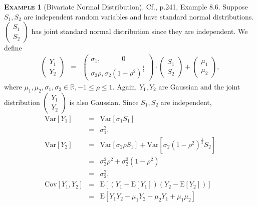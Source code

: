 \documentclass[a4paper, twoside, 11pt]{article}
\theoremstyle{definition}
\newtheorem{example}[definition]{\scshape Example}
\begin{document}
  \begin{example}[Bivariate Normal Distribution]
	Cf.\cite{severini}, p.241, Example 8.6. Suppose $S_1, S_2$ are independent random variables and have standard normal distributions. $\left(
	  \begin{array}{c}
		S_1 \\
		S_2
	  \end{array}
	\right)$  has joint standard normal distribution since they are independent. We define
	\begin{eqnarray}
	  \left(
	  \begin{array}{c}
		Y_1 \\
		Y_2
	  \end{array}
	  \right)
	  &=& 
	  \left(
	  \begin{array}{l}
		\sigma_1,\hspace{3em} 0 \\
		\sigma_2 \rho, \sigma_2(1-\rho^2)^{\frac{1}{2}}
	  \end{array}
	\right) \cdot
	  \left(
	  \begin{array}{c}
		S_1 \\
		S_2
	  \end{array}
	\right)  +
	\left(
	  \begin{array}{c}
		\mu_1 \\
		\mu_2
	  \end{array}
	\right)
	\label{sec:bi},
	\end{eqnarray}
	where $\mu_1, \mu_2, \sigma_1, \sigma_2 \in \mathbb{R}, -1 \le \rho \le 1$. Again, $Y_1, Y_2$ are Gaussian and the joint distribution  $\left(
	  \begin{array}{c}
		Y_1 \\
		Y_2
	  \end{array}
	  \right)$ is also Gaussian.  Since $S_1, S_2$ are independent,
	  \begin{eqnarray*}
		\mathrm{Var}[Y_1] &=& \mathrm{Var}[\sigma_1 S_1]\\
						   &=& \sigma_1^2 ,\\
						   \mathrm{Var}[Y_2] &=& \mathrm{Var}[\sigma_2\rho S_1] + \mathrm{Var}[\sigma_2 (1-\rho^2)^{\frac{1}{2}} S_2]\\
						   &=& \sigma_2^2 \rho^2 + \sigma_2^2(1 - \rho^2)\\
						   &=& \sigma_2^2,\\
						   \mathrm{Cov}[Y_1, Y_2] &=& \mathrm{E}[(Y_1 - \mathrm{E}[Y_1])(Y_2 - \mathrm{E}[Y_2])]\\
						   &=& \mathrm{E}[Y_1Y_2 - \mu_1Y_2 - \mu_2Y_1 + \mu_1\mu_2]\\

\end{eqnarray*}
\end{example}
\end{document}
